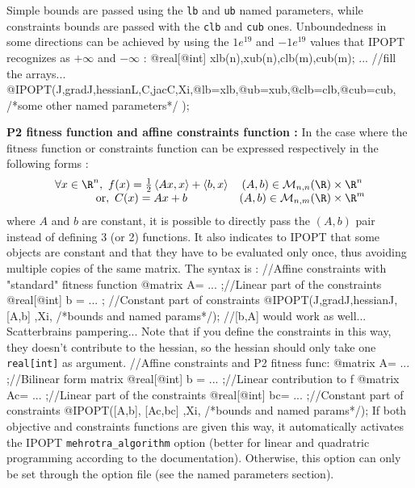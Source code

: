 \documentclass[a4paper,twoside,12pt]{book}
\begin{document}
Simple bounds are passed using the {\tt lb} and {\tt ub} named parameters, while constraints bounds are passed with the {\tt clb} and {\tt cub} ones. Unboundedness in some directions can be achieved by using the $1e^{19}$ and $-1e^{19}$ values that IPOPT recognizes as $+\infty$ and $-\infty$ :
\bFF
  @real[@int] xlb(n),xub(n),clb(m),cub(m);
  ... //fill the arrays...
  @IPOPT(J,gradJ,hessianL,C,jacC,Xi,@lb=xlb,@ub=xub,@clb=clb,@cub=cub,  /*some other named parameters*/ );
\eFF

\textbf{P2 fitness function and affine constraints function :} In the case where the fitness function or constraints function can be expressed respectively in the following forms :
$$
\begin{array}{c c}
	\forall x\in\R^{n},\  f(x) = \frac{1}{2}\left\langle Ax,x \right\rangle + \left\langle b,x\right\rangle & (A,b)\in\mathcal{M}_{n,n}(\R)\times\R^{n} \\
	\mathrm{or} ,\ C(x) = Ax + b & (A,b)\in\mathcal{M}_{n,m}(\R)\times\R^{m} 
\end{array}
$$
where $A$ and $b$ are constant, it is possible to directly pass the $(A,b)$ pair instead of defining 3 (or 2) functions. It also indicates to IPOPT that some objects are constant and that they have to be evaluated only once, thus avoiding multiple copies of the same matrix. The syntax is :
\bFF
  //Affine constraints with "standard" fitness function
  @matrix A= ... ;//Linear part of the constraints
  @real[@int] b = ... ; //Constant part of constraints
  @IPOPT(J,gradJ,hessianJ, [A,b] ,Xi, /*bounds and named params*/); 
  //[b,A] would work as well... Scatterbrains pampering...
\eFF
Note that if you define the constraints in this way, they doesn't contribute to the hessian, so the hessian should only take one {\tt real[int]} as argument. 
\bFF
  //Affine constraints and P2 fitness func:
  @matrix A= ... ;//Bilinear form matrix
  @real[@int] b = ... ;//Linear contribution to f
  @matrix Ac= ... ;//Linear part of the constraints
  @real[@int] bc= ... ;//Constant part of constraints
  @IPOPT([A,b], [Ac,bc] ,Xi, /*bounds and named params*/);
\eFF
If both objective and constraints functions are given this way, it automatically activates the IPOPT {\tt mehrotra\_algorithm} option (better for linear and quadratric programming according to the documentation). Otherwise, this option can only be set through the option file (see the named parameters section). 
\end{document}
